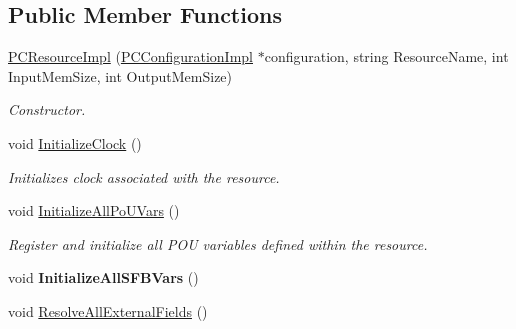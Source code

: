 \subsection*{Public Member Functions}
\begin{DoxyCompactItemize}
\item 
\hyperlink{classpc__emulator_1_1PCResourceImpl_ad8122975b5daf8683d9599176a63b33a}{P\+C\+Resource\+Impl} (\hyperlink{classpc__emulator_1_1PCConfigurationImpl}{P\+C\+Configuration\+Impl} $\ast$configuration, string Resource\+Name, int Input\+Mem\+Size, int Output\+Mem\+Size)
\begin{DoxyCompactList}\small\item\em Constructor. \end{DoxyCompactList}\item 
void \hyperlink{classpc__emulator_1_1PCResourceImpl_a7e2b6e746c7b3cef8c086b1c3dd18b8e}{Initialize\+Clock} ()\hypertarget{classpc__emulator_1_1PCResourceImpl_a7e2b6e746c7b3cef8c086b1c3dd18b8e}{}\label{classpc__emulator_1_1PCResourceImpl_a7e2b6e746c7b3cef8c086b1c3dd18b8e}

\begin{DoxyCompactList}\small\item\em Initializes clock associated with the resource. \end{DoxyCompactList}\item 
void \hyperlink{classpc__emulator_1_1PCResourceImpl_ac3074be3fc6d79651d7921128c86aedb}{Initialize\+All\+Po\+U\+Vars} ()\hypertarget{classpc__emulator_1_1PCResourceImpl_ac3074be3fc6d79651d7921128c86aedb}{}\label{classpc__emulator_1_1PCResourceImpl_ac3074be3fc6d79651d7921128c86aedb}

\begin{DoxyCompactList}\small\item\em Register and initialize all P\+OU variables defined within the resource. \end{DoxyCompactList}\item 
void {\bfseries Initialize\+All\+S\+F\+B\+Vars} ()\hypertarget{classpc__emulator_1_1PCResourceImpl_a019ed31f83f95c462135c8e9a1d0cfae}{}\label{classpc__emulator_1_1PCResourceImpl_a019ed31f83f95c462135c8e9a1d0cfae}

\item 
void \hyperlink{classpc__emulator_1_1PCResourceImpl_a1da54f6b883793da02f8b8d4ff980c45}{Resolve\+All\+External\+Fields} ()\hypertarget{classpc__emulator_1_1PCResourceImpl_a1da54f6b883793da02f8b8d4ff980c45}{}\label{classpc__emulator_1_1PCResourceImpl_a1da54f6b883793da02f8b8d4ff980c45}


\end{DoxyCompactItemize}
